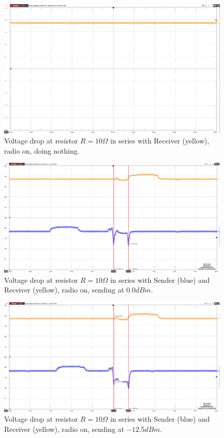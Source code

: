 \begin{figure}[H]
	\centering
	\includegraphics[width=1\linewidth]{implementation/energylab/fig/radioOn_idle.png}
	\caption{Voltage drop at resistor $R=10\Omega$ in series with Receiver (yellow), radio on, doing nothing.}
	\label{fig:radioOn_idle}
\end{figure}

\begin{figure}[H]
	\centering
	\includegraphics[width=1\linewidth]{implementation/energylab/fig/radioOn_sendHighSignal.png}
	\caption{Voltage drop at resistor $R=10\Omega$ in series with Sender (blue) and Receiver (yellow), radio on, sending at $0.0dBm$.}
	\label{fig:radioOn_sendHighSignal}
\end{figure}

\begin{figure}[H]
	\centering
	\includegraphics[width=1\linewidth]{implementation/energylab/fig/radioOn_sendMidSignal.png}
	\caption{Voltage drop at resistor $R=10\Omega$ in series with Sender (blue) and Receiver (yellow), radio on, sending at $-12.5dBm$.}
	\label{fig:radioOn_sendMidSignal}
\end{figure}

